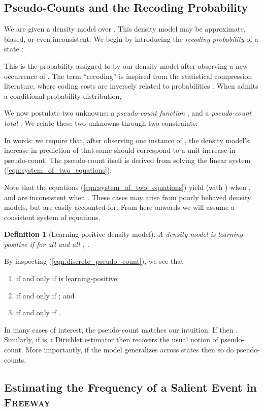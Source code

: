 \documentclass{article}
\newtheorem{defn}{Definition}
\newcommand{\eqnref}[1]{(\ref{eqn:#1})}
\newcommand{\gamename}[1]{\textsc{#1}}
\begin{document}
\subsection{Pseudo-Counts and the Recoding Probability}

We are given a density model  over . This density model may be approximate, biased, or even inconsistent. We begin by introducing the \emph{recoding probability} of a state : 

This is the probability assigned to  by our density model after observing a new 
occurrence of . The term ``recoding'' is inspired from the statistical compression literature, where coding costs are inversely related to probabilities \citep{cover91elements}. When  admits a conditional probability distribution,

We now postulate two unknowns: a \emph{pseudo-count function} , and a \emph{pseudo-count total} . We relate these two unknowns through two constraints: 

In words: we require that, after observing one instance of , the density model's increase in prediction of that same  should correspond to a unit increase in pseudo-count. The pseudo-count itself is derived from solving the linear system \eqnref{system_of_two_equations}: 


Note that the equations \eqnref{system_of_two_equations} yield  (with ) when , and are inconsistent when . 
These cases may arise from poorly behaved density models, but are easily accounted for. From here onwards we will assume a consistent system of equations.

\begin{defn}[Learning-positive density model]\label{defn:learning_positive}
A density model  is \emph{learning-positive} if for all  and all , .
\end{defn}
By inspecting \eqnref{discrete_pseudo_count}, we see that
\begin{enumerate}
    \item{ if and only if  is learning-positive;}
    \item{ if and only if ; and}
    \item{ if and only if .}
\end{enumerate}
In many cases of interest, the pseudo-count  matches our intuition. If  then . Similarly, if  is a Dirichlet estimator then  recovers the usual notion of pseudo-count. More importantly, if the  model generalizes across states then so do pseudo-counts.

\subsection{Estimating the Frequency of a Salient Event in \gamename{Freeway}}\label{sec:pseudo_counting_salient_events}
\end{document}
